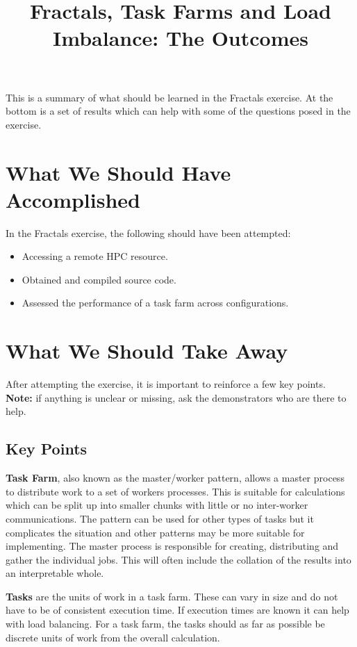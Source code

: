 \documentclass{article}
\title{Fractals, Task Farms and Load Imbalance: The Outcomes}
\date{}
\begin{document}
\makeEPCCtitle

\vspace*{-1cm}


This is a summary of what should be learned in the Fractals exercise. At the bottom is a set of results which can help with some of the questions posed in the exercise.

\section{What We Should Have Accomplished}

In the Fractals exercise, the following should have been attempted:
\begin{itemize}
\item Accessing a remote HPC resource.
\item Obtained and compiled source code.
\item Assessed the performance of a task farm across configurations.
\end{itemize}

\section{What We Should Take Away}

After attempting the exercise, it is important to reinforce a few key points. 
\textbf{Note:} if anything is unclear or missing, ask the
demonstrators who are there to help.

\subsection{Key Points}


\textbf{Task Farm}, also known as the master/worker pattern, allows a
master process to distribute work to a set of workers processes. This
is suitable for calculations which can be split up into smaller chunks
with little or no inter-worker communications. The pattern can be used
for other types of tasks but it complicates the situation and other
patterns may be more suitable for implementing. The master process is
responsible for creating, distributing and gather the individual
jobs. This will often include the collation of the results into an
interpretable whole.


\textbf{Tasks} are the units of work in a task farm. These can vary in
size and do not have to be of consistent execution time. If execution
times are known it can help with load balancing. For a task farm, the
tasks should as far as possible be discrete units of work from the
overall calculation.
\end{document}
